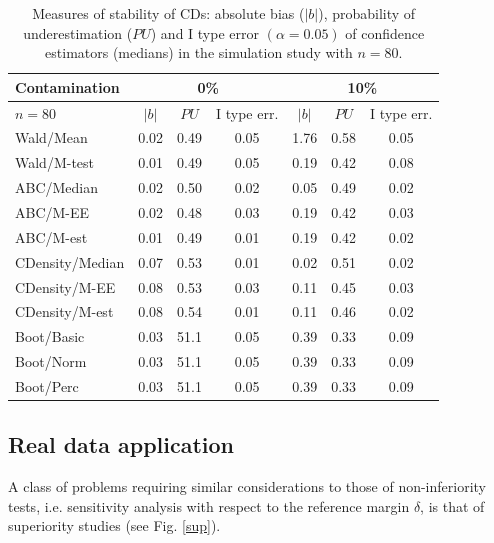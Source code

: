 \documentclass[preprint,12pt,authoryear]{elsarticle}
\begin{document}
\begin{table}[h!]
\centering
\begin{tabular}{ |l|c|c|c|c|c|c|}
  \hline
  Contamination &\multicolumn{3}{c|}{0\%} & \multicolumn{3}{c|}{10\%}   \\  
\hline
$ n=80$ & $|b|$ & $PU$   & I type err.& $|b|$ & $PU$ & I type err.\\ 
  \hline
  Wald/Mean   &0.02  & 0.49   &0.05&1.76 &0.58 & 0.05\\ 
  Wald/M-test & 0.01 &0.49&  0.05&0.19 &0.42 &  0.08\\ 
  ABC/Median & 0.02  &  0.50& 0.02   &0.05&0.49&0.02\\ 
   ABC/M-EE &0.02 &  0.48&0.03 & 0.19& 0.42 &0.03\\ 
   ABC/M-est &0.01  &0.49 &0.01&0.19&  0.42& 0.02\\ 
  CDensity/Median & 0.07  &  0.53& 0.01   &0.02& 0.51&0.02\\ 
   CDensity/M-EE &0.08 &  0.53&0.03 & 0.11&0.45 &0.03\\ 
   CDensity/M-est &0.08  &0.54 &0.01 &0.11 & 0.46& 0.02\\ 
Boot/Basic &0.03&51.1&0.05&0.39&0.33&0.09\\
Boot/Norm&0.03&51.1&0.05&0.39&0.33&0.09\\
Boot/Perc&0.03&51.1&0.05&0.39&0.33&0.09\\
   \hline
\end{tabular}
	\caption{Measures of stability of CDs: absolute bias ($|b|$), probability of underestimation ($PU$) and I type error $(\alpha=0.05)$ of confidence estimators (medians) in the simulation study with $ n=80$. }
\label{sim80}
\end{table}

 
 
\subsection{Real data application}

A class of problems requiring similar considerations to those of non-inferiority tests, i.e. sensitivity analysis with respect to the reference margin $\delta$, is that of superiority studies (see Fig. \ref{sup}).
\end{document}
